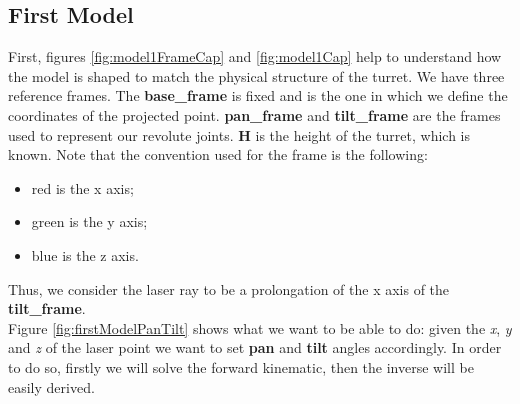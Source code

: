 \subsection{First Model}\label{subs:firstModel}
First, figures \ref{fig:model1FrameCap} and \ref{fig:model1Cap} help to understand how the model is shaped to match the physical structure of the turret. We have three reference frames. The \textbf{base\_frame} is fixed and is the one in which we define the coordinates of the projected point. \textbf{pan\_frame} and \textbf{tilt\_frame} are the frames used to represent our revolute joints.
\textbf{H} is the height of the turret, which is known. Note that the convention used for the frame is the following:
\begin{itemize}
    \item red is the x axis;
    \item green is the y axis;
    \item blue is the z axis.
\end{itemize}
Thus, we consider the laser ray to be a prolongation of the x axis of the \textbf{tilt\_frame}. \\
Figure \ref{fig:firstModelPanTilt} shows what we want to be able to do: given the \textit{x}, \textit{y} and \textit{z} of the laser point we want to set \textbf{pan} and \textbf{tilt} angles accordingly. In order to do so, firstly we will solve the forward kinematic, then the inverse will be easily derived.

